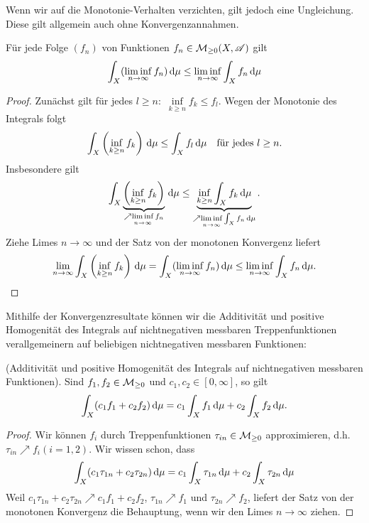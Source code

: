 Wenn wir auf die Monotonie-Verhalten verzichten, gilt jedoch eine Ungleichung. Diese gilt allgemein auch ohne Konvergenzannahmen.
\begin{satz}
\begin{mdframed}
Für jede Folge $(f_n)$ von Funktionen $f_n \in \mathcal{M}_{\geq 0}(X,\mathscr{A})$ gilt
$$
\int_X (\liminf\limits_{n\to\infty} f_n)\, \mathrm{d} \mu \leq \liminf\limits_{n\to \infty} \int_X f_n \, \mathrm{d}\mu
$$
\end{mdframed}
\begin{proof}
Zunächst gilt für jedes $l\geq n:$ $\inf\limits_{k \geq n}f_k \leq f_l$. Wegen der Monotonie des Integrals folgt
$$
\int_X \left(\inf_{k\geq n} f_k\right) \, \mathrm{d} \mu \leq  \int_X f_l \, \mathrm{d} \mu \quad \text{für jedes } l \geq n.
$$
Insbesondere gilt
$$
\int_X \underbrace{\left(\inf_{k\geq n} f_k\right)}_{\nearrow \liminf\limits_{n\to\infty} f_n} \, \mathrm{d} \mu \leq  \underbrace{\inf_{k\geq n}  \int_X f_k \, \mathrm{d} \mu}_{\nearrow \liminf\limits_{n\to \infty}\int_X f_n \, \mathrm{d} \mu}.
$$
Ziehe Limes $n\to \infty $ und der Satz von der monotonen Konvergenz liefert
$$\lim_{n\to \infty }\int_X \left(\inf_{k\geq n} f_k\right) \, \mathrm{d} \mu= \int_X (\liminf_{n\to\infty} f_n) \, \mathrm{d} \mu \leq \liminf_{n\to \infty}\int_X f_n \, \mathrm{d} \mu.$$
\end{proof}
\end{satz}

Mithilfe der Konvergenzresultate können wir die Additivität und positive Homogenität des Integrals auf nichtnegativen messbaren Treppenfunktionen verallgemeinern auf beliebigen nichtnegativen messbaren Funktionen:

\begin{lemma} \label{homogen-nicht-neg}
\begin{mdframed}(Additivität und positive Homogenität des Integrals auf nichtnegativen messbaren Funktionen).
Sind $f_1,f_2\in \mathcal{M}_{\geq 0}$ und $c_1,c_2\in [0,\infty]$, so gilt
$$
\int_X (c_1f_1+c_2f_2)\, \mathrm{d} \mu = c_1 \int_X f_1 \, \mathrm{d} \mu +c_2 \int_X f_2 \, \mathrm{d} \mu.
$$
\end{mdframed}
\begin{proof}
Wir können $f_i$ durch Treppenfunktionen $\tau_{in} \in \mathcal{M}_{\geq 0}$ approximieren, d.h. $\tau_{in}\nearrow f_i (i=1,2)$. Wir wissen schon, dass
$$
\int_X (c_1 \tau_{1n}+c_2 \tau_{2n}) \, \mathrm{d} \mu =c_1 \int_X \tau_{1n}\, \mathrm{d} \mu+c_2 \int_X \tau_{2n} \, \mathrm{d} \mu
$$
Weil $c_1 \tau_{1n}+c_2 \tau_{2n} \nearrow c_1f_1+c_2f_2$, $\tau_{1n}\nearrow f_1$ und $\tau_{2n}\nearrow f_2$, liefert der Satz von der monotonen Konvergenz die Behauptung, wenn wir den Limes $n\to \infty$ ziehen.
\end{proof}
\end{lemma}

